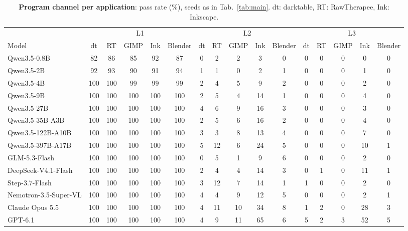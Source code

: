 \begin{table}[t]
  \centering
  \footnotesize
  \caption{\textbf{Program channel per application}: pass rate (\%), seeds as in Tab.~\ref{tab:main}. dt: darktable, RT: RawTherapee, Ink: Inkscape.}
  \label{tab:app-prog}
  \setlength{\tabcolsep}{3.4pt}
  \begin{tabular}{@{}l ccccc @{\hspace{7pt}} ccccc @{\hspace{7pt}} ccccc@{}}
    \toprule
    & \multicolumn{5}{c}{L1} & \multicolumn{5}{c}{L2} & \multicolumn{5}{c}{L3} \\
    \cmidrule(r{7pt}){2-6}\cmidrule(r{7pt}){7-11}\cmidrule{12-16}
    Model & dt & RT & GIMP & Ink & Blender & dt & RT & GIMP & Ink & Blender & dt & RT & GIMP & Ink & Blender \\
    \midrule
    Qwen3.5-0.8B           & 82 & 86 & 85 & 92 & 87 & 0 & 2 & 2 & 3 & 0 & 0 & 0 & 0 & 0 & 0 \\
    Qwen3.5-2B             & 92 & 93 & 90 & 91 & 94 & 1 & 1 & 0 & 2 & 1 & 0 & 0 & 0 & 1 & 0 \\
    Qwen3.5-4B             & 100 & 100 & 99 & 99 & 99 & 2 & 4 & 5 & 9 & 2 & 0 & 0 & 0 & 2 & 0 \\
    Qwen3.5-9B             & 100 & 100 & 100 & 100 & 100 & 2 & 5 & 4 & 14 & 1 & 0 & 0 & 0 & 4 & 0 \\
    Qwen3.5-27B            & 100 & 100 & 100 & 100 & 100 & 4 & 6 & 9 & 16 & 3 & 0 & 0 & 0 & 3 & 0 \\
    Qwen3.5-35B-A3B        & 100 & 100 & 100 & 100 & 100 & 2 & 5 & 6 & 16 & 2 & 0 & 0 & 0 & 4 & 0 \\
    Qwen3.5-122B-A10B      & 100 & 100 & 100 & 100 & 100 & 3 & 3 & 8 & 13 & 4 & 0 & 0 & 0 & 7 & 0 \\
    Qwen3.5-397B-A17B      & 100 & 100 & 100 & 100 & 100 & 5 & 12 & 6 & 24 & 5 & 0 & 0 & 0 & 10 & 1 \\
    \midrule
    GLM-5.3-Flash          & 100 & 100 & 100 & 100 & 100 & 0 & 5 & 1 & 9 & 6 & 0 & 0 & 0 & 2 & 0 \\
    \midrule
    DeepSeek-V4.1-Flash    & 100 & 100 & 100 & 100 & 100 & 2 & 4 & 4 & 14 & 3 & 0 & 1 & 0 & 11 & 1 \\
    \midrule
    Step-3.7-Flash         & 100 & 100 & 100 & 100 & 100 & 3 & 12 & 7 & 14 & 1 & 1 & 0 & 0 & 2 & 0 \\
    \midrule
    Nemotron-3.5-Super-VL  & 100 & 100 & 100 & 100 & 100 & 4 & 4 & 9 & 12 & 5 & 0 & 0 & 0 & 2 & 1 \\
    \midrule
    Claude Opus 5.5        & 100 & 100 & 100 & 100 & 100 & 4 & 11 & 10 & 34 & 8 & 1 & 2 & 0 & 28 & 3 \\
    \midrule
    GPT-6.1                & 100 & 100 & 100 & 100 & 100 & 4 & 9 & 11 & 65 & 6 & 5 & 2 & 3 & 52 & 5 \\
    \bottomrule
  \end{tabular}
\end{table}

